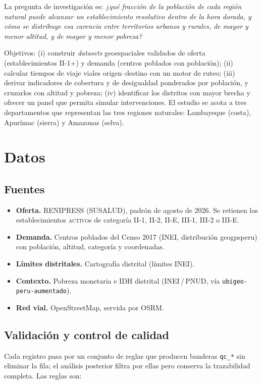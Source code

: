 \documentclass[11pt,a4paper]{article}
\begin{document}
La pregunta de investigaci\'on es: \emph{¿qu\'e fracci\'on de la poblaci\'on de
cada regi\'on natural puede alcanzar un establecimiento resolutivo dentro de la
hora dorada, y c\'omo se distribuye esa carencia entre territorios urbanos y
rurales, de mayor y menor altitud, y de mayor y menor pobreza?}

Objetivos: (i) construir \emph{datasets} geoespaciales validados de oferta
(establecimientos II-1+) y demanda (centros poblados con poblaci\'on); (ii)
calcular tiempos de viaje viales origen--destino con un motor de ruteo; (iii)
derivar indicadores de cobertura y de desigualdad ponderados por poblaci\'on, y
cruzarlos con altitud y pobreza; (iv) identificar los distritos con mayor
brecha y ofrecer un panel que permita simular intervenciones. El estudio se
acota a tres departamentos que representan las tres regiones naturales:
Lambayeque (costa), Apur\'imac (sierra) y Amazonas (selva).

\section{Datos}

\subsection{Fuentes}
\begin{itemize}
  \item \textbf{Oferta.} RENIPRESS (SUSALUD), padr\'on de agosto de 2026.
        Se retienen los establecimientos \textsc{activo}s de categor\'ia
        II-1, II-2, II-E, III-1, III-2 o III-E.
  \item \textbf{Demanda.} Centros poblados del Censo 2017 (INEI, distribuci\'on
        geogpsperu) con poblaci\'on, altitud, categor\'ia y coordenadas.
  \item \textbf{L\'imites distritales.} Cartograf\'ia distrital (l\'imites INEI).
  \item \textbf{Contexto.} Pobreza monetaria e IDH distrital
        (INEI\,/\,PNUD, v\'ia \texttt{ubigeo-peru-aumentado}).
  \item \textbf{Red vial.} OpenStreetMap, servida por OSRM.
\end{itemize}

\subsection{Validaci\'on y control de calidad}
Cada registro pasa por un conjunto de reglas que producen banderas
\texttt{qc\_*} sin eliminar la fila; el an\'alisis posterior filtra por ellas
pero conserva la trazabilidad completa. Las reglas son:
\end{document}
